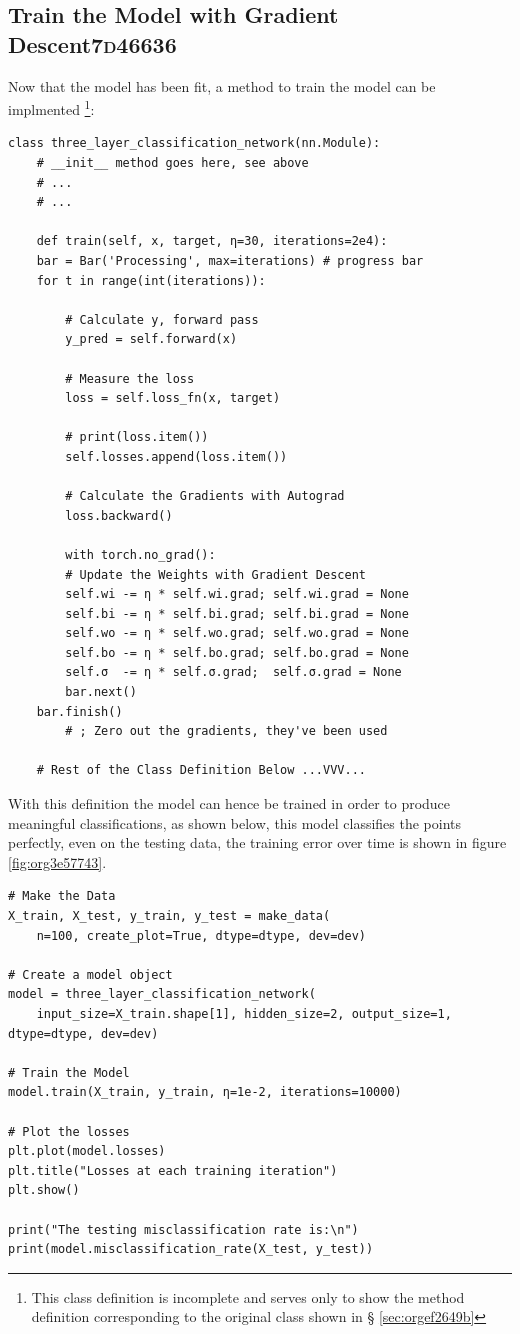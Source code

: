 \documentclass[a4paper,11pt,twoside]{article}
\begin{document}
\subsection{Train the Model with Gradient Descent\hfill{}\textsc{7d46636}}
\label{sec:orga8615e7}
Now that the model has been fit, a method to train the model can be
implmented \footnote{This class definition is incomplete and serves only to show the
method definition corresponding to the original class shown in \S
\ref{sec:orgef2649b}}:
\begin{verbatim}
class three_layer_classification_network(nn.Module):
    # __init__ method goes here, see above
    # ...
    # ...

    def train(self, x, target, η=30, iterations=2e4):
	bar = Bar('Processing', max=iterations) # progress bar
	for t in range(int(iterations)):

	    # Calculate y, forward pass
	    y_pred = self.forward(x)

	    # Measure the loss
	    loss = self.loss_fn(x, target)

	    # print(loss.item())
	    self.losses.append(loss.item())

	    # Calculate the Gradients with Autograd
	    loss.backward()

	    with torch.no_grad():
		# Update the Weights with Gradient Descent 
		self.wi -= η * self.wi.grad; self.wi.grad = None
		self.bi -= η * self.bi.grad; self.bi.grad = None
		self.wo -= η * self.wo.grad; self.wo.grad = None
		self.bo -= η * self.bo.grad; self.bo.grad = None
		self.σ  -= η * self.σ.grad;  self.σ.grad = None
	    bar.next()
	bar.finish()
		# ; Zero out the gradients, they've been used

    # Rest of the Class Definition Below ...VVV...
\end{verbatim}

With this definition the model can hence be trained in order to
produce meaningful classifications, as shown below, this model classifies the
points perfectly, even on the testing data, the training error 
over time is shown in figure \ref{fig:org3e57743}.

\begin{verbatim}
# Make the Data
X_train, X_test, y_train, y_test = make_data(
    n=100, create_plot=True, dtype=dtype, dev=dev)

# Create a model object
model = three_layer_classification_network(
    input_size=X_train.shape[1], hidden_size=2, output_size=1, dtype=dtype, dev=dev)

# Train the Model
model.train(X_train, y_train, η=1e-2, iterations=10000)

# Plot the losses
plt.plot(model.losses)
plt.title("Losses at each training iteration")
plt.show()

print("The testing misclassification rate is:\n")
print(model.misclassification_rate(X_test, y_test))
\end{verbatim}
\end{document}
